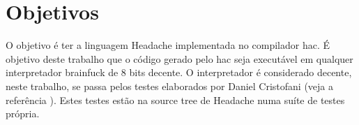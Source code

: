 %
%
% 
%

\chapter{Objetivos}
\noindent
O objetivo é ter a linguagem Headache implementada no compilador hac.
É objetivo deste trabalho que o código gerado pelo hac seja executável em qualquer interpretador brainfuck de 8 bits decente. O interpretador é considerado decente, neste trabalho, se passa pelos testes elaborados por Daniel Cristofani (veja a referência \cite{BrainfuckFluff}). Estes testes estão na source tree de Headache numa suíte de testes própria.	

